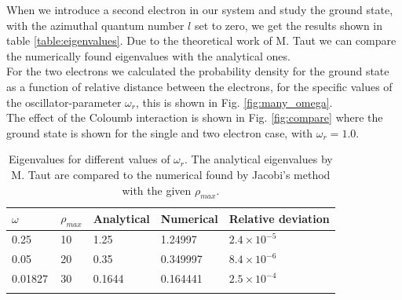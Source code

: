 \documentclass[%
 reprint,
nofootinbib,
aps,
]{revtex4-1}
\begin{document}
When we introduce a second electron in our system and study the ground state, with the azimuthal quantum number $l$ set to zero, we get the results shown in table \vref{table:eigenvalues}. Due to the theoretical work of M. Taut\cite{PhysRevA.48.3561} we can compare the numerically found eigenvalues with the analytical ones.
\\For the two electrons we calculated the probability density for the ground state as a function of  relative distance between the electrons, for the specific values of the oscillator-parameter $\omega_r$, this is shown in Fig. \vref{fig:many_omega}. \\
The effect of the Coloumb interaction is shown in Fig. \vref{fig:compare} where the ground state is shown for the single and two electron case, with $\omega_r=1.0$.

\begin{table}[]
\caption{Eigenvalues for different values of $\omega_r$. The analytical eigenvalues by M. Taut\cite{PhysRevA.48.3561} are compared to the numerical found by Jacobi's method with the given $\rho_{max}$.}
\begin{tabular}{@{}lllll@{}}
\toprule
$\omega$ & $\rho_{max}$ & Analytical & Numerical & Relative deviation \\ \midrule
0.25     & 10   \qquad \quad       & 1.25      & 1.24997 &  $2.4\times 10^{-5}$  \\
0.05     & 20           & 0.35       & 0.349997 &  $8.4\times 10^{-6}$ \\
0.01827\qquad  \,  & 30           & 0.1644  \qquad \quad   & 0.164441 & $2.5\times 10^{-4}$  \\ \botrule
\end{tabular}
\label{table:eigenvalues}
\end{table}
\end{document}
